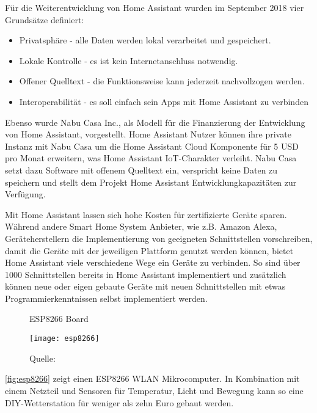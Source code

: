 Für die Weiterentwicklung von Home Assistant wurden im September 2018 vier Grundsätze definiert:

\begin{itemize}
	\item Privatsphäre - alle Daten werden lokal verarbeitet und gespeichert.
	\item Lokale Kontrolle - es ist kein Internetanschluss notwendig.
	\item Offener Quelltext - die Funktionsweise kann jederzeit nachvollzogen werden.
	\item Interoperabilität - es soll einfach sein Apps mit Home Assistant zu verbinden
\end{itemize}

Ebenso wurde Nabu Casa Inc., als Modell für die Finanzierung der Entwicklung von Home Assistant, vorgestellt.
Home Assistant Nutzer können ihre private Instanz mit Nabu Casa um die Home Assistant Cloud Komponente für 5 USD pro Monat erweitern, was Home Assistant \ac{IoT}-Charakter verleiht.
Nabu Casa setzt dazu Software mit offenem Quelltext ein, verspricht keine Daten zu speichern und stellt dem Projekt Home Assistant Entwicklungkapazitäten zur Verfügung.

Mit Home Assistant lassen sich hohe Kosten für zertifizierte Geräte sparen.
Während andere Smart Home System Anbieter, wie z.B. Amazon Alexa, Geräteherstellern die Implementierung von geeigneten Schnittstellen vorschreiben, damit die Geräte mit der jeweiligen Plattform genutzt werden können, bietet Home Assistant viele verschiedene Wege ein Geräte zu verbinden.
So sind über 1000 Schnittstellen bereits in Home Assistant implementiert und zusätzlich können neue oder eigen gebaute Geräte mit neuen Schnittstellen mit etwas Programmierkenntnissen selbst implementiert werden.

\begin{wrapfigure}{r}{0.4\textwidth}
	\centering
	\caption{ESP8266 Board}
	\texttt{[image: esp8266]}
	\caption*{\footnotesize{Quelle: }}
	\label{fig:esp8266}
\end{wrapfigure}

\autoref{fig:esp8266} zeigt einen ESP8266 WLAN Mikrocomputer.
In Kombination mit einem Netzteil und Sensoren für Temperatur, Licht und Bewegung kann so eine \ac{DIY}-Wetterstation für weniger als zehn Euro gebaut werden.

